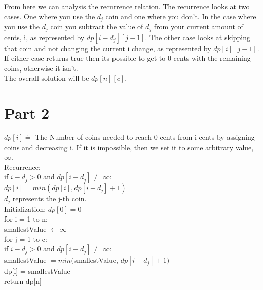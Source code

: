 \documentclass[11pt,letter]{article}
\newcommand{\2}{\{0, 1\}}
\newcommand{\1}{\mathds{1}}
\theoremstyle{definition}
\begin{document}
From here we can analysis the recurrence relation. The recurrence looks at two cases. One where you use the $d_j$ coin and one where you don't. In the case where you use the $d_j$ coin you subtract the value of $d_j$ from your current amount of cents, i, as represented by $dp[i - d_j][j-1]$. The other case looks at skipping that coin and not changing the current i change, as represented by $dp[i][j-1]$.\\

If either case returns true then its possible to get to 0 cents with the remaining coins, otherwise it isn't.\\

The overall solution will be $dp[n][c]$. \\


\section*{Part 2}

$dp[i] \doteq $ The Number of coins needed to reach 0 cents from i cents by assigning coins and decreasing i. If it is impossible, then we set it to some arbitrary value, $\infty$.\\

Recurrence: \\
if $i - d_j > 0$ and $dp[i - d_j] \neq$ $\infty$:\\
\hspace*{3mm} $dp[i] = min(dp[i], dp[i - d_j] + 1)$\\
$d_j$ represents the j-th coin.\\


Initialization: $dp[0] = 0$ \\


for i = 1 to n: \\
\hspace*{3mm} smallestValue $\leftarrow \infty$ \\
\hspace*{3mm} for j = 1 to c: \\
\hspace*{6mm} if $i - d_j > 0$ and $dp[i - d_j] \neq$ $\infty$:\\
\hspace*{9mm} smallestValue $= min($smallestValue, $dp[i - d_j] + 1)$\\
\hspace*{3mm} dp[i] = smallestValue\\
return dp[n]\\
\end{document}
